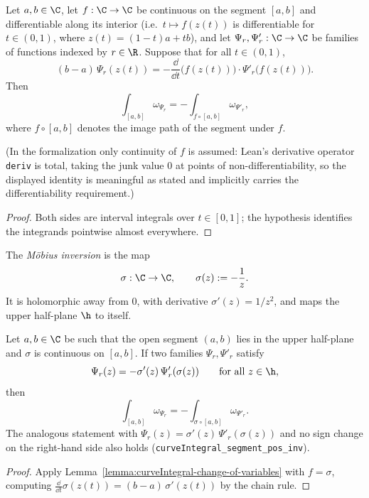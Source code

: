 \begin{lemma}\label{lemma:curveIntegral-change-of-variables}\leanok
  Let $a, b \in \C$, let $f : \C \to \C$ be continuous on the segment $[a,b]$ and differentiable
  along its interior (i.e.\ $t \mapsto f(z(t))$ is differentiable for $t \in (0,1)$, where
  $z(t) = (1-t)a + tb$), and let
  $\Psi_r, \Psi'_r : \C \to \C$ be families of functions indexed by $r \in \R$. Suppose that for
  all $t \in (0,1)$,
  \[
    (b - a)\, \Psi_r(z(t))
      = -\frac{\dd}{\dd t}\bigl(f(z(t))\bigr) \cdot \Psi'_r\bigl(f(z(t))\bigr).
  \]
  Then
  \[
    \int_{[a,b]} \omega_{\Psi_r} = -\int_{f \circ [a,b]} \omega_{\Psi'_r},
  \]
  where $f \circ [a,b]$ denotes the image path of the segment under $f$.

  (In the formalization only continuity of $f$ is assumed: Lean's derivative operator
  \texttt{deriv} is total, taking the junk value $0$ at points of non-differentiability, so the
  displayed identity is meaningful as stated and implicitly carries the differentiability
  requirement.)
\end{lemma}
\begin{proof}\leanok
  Both sides are interval integrals over $t \in [0,1]$; the hypothesis identifies the integrands
  pointwise almost everywhere.
\end{proof}

\begin{definition}\label{def:mobiusInv}\leanok
  The \emph{M\"obius inversion} is the map
  \[
    \sigma : \C \to \C, \qquad \sigma(z) := -\frac{1}{z}.
  \]
  It is holomorphic away from $0$, with derivative $\sigma'(z) = 1/z^2$, and maps the upper
  half-plane $\h$ to itself.
\end{definition}

\begin{lemma}\label{lemma:curveIntegral-mobiusInv}\leanok
  Let $a, b \in \C$ be such that the open segment $(a, b)$ lies in the upper half-plane and
  $\sigma$ is continuous on $[a,b]$. If two families $\Psi_r, \Psi'_r$ satisfy
  \[
    \Psi_r(z) = -\sigma'(z)\, \Psi'_r(\sigma(z)) \qquad \text{for all } z \in \h,
  \]
  then
  \[
    \int_{[a,b]} \omega_{\Psi_r} = -\int_{\sigma \circ [a,b]} \omega_{\Psi'_r}.
  \]
  The analogous statement with $\Psi_r(z) = \sigma'(z)\, \Psi'_r(\sigma(z))$ and no sign change on
  the right-hand side also holds (\texttt{curveIntegral\_segment\_pos\_inv}).
\end{lemma}
\begin{proof}\leanok
  Apply Lemma~\ref{lemma:curveIntegral-change-of-variables} with $f = \sigma$, computing
  $\frac{\dd}{\dd t} \sigma(z(t)) = (b - a)\,\sigma'(z(t))$ by the chain rule.
\end{proof}

